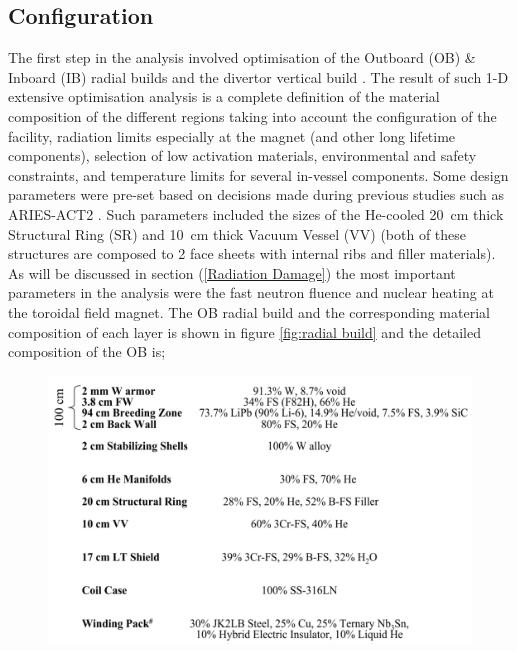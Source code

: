 \documentclass[12pt, letterpaper]{elsarticle}
\begin{document}
\subsection{Configuration} \label{Configuration}
The first step in the analysis involved optimisation of the Outboard (OB) \& Inboard (IB) radial builds and the divertor vertical build \cite{ref_2}. The result of such 1-D extensive optimisation analysis is a complete definition of the material composition of the different regions taking into account the configuration of the facility, radiation limits especially at the magnet (and other long lifetime components), selection of low activation materials, environmental and safety constraints, and temperature limits for several in-vessel components. Some design parameters were pre-set based on decisions made during previous studies such as ARIES-ACT2 \cite{ref_3}. Such parameters included the sizes of the He-cooled \SI{20}{cm} thick Structural Ring (SR) and \SI{10}{cm} thick Vacuum Vessel (VV) (both of these structures are composed to 2 face sheets with internal ribs and filler materials). As will be discussed in section (\ref{Radiation Damage}) the most important parameters in the analysis were the fast neutron fluence and nuclear heating at the toroidal field magnet. The OB radial build and the corresponding material composition of each layer is shown in figure \ref{fig:radial build} and the detailed composition of the OB is;
\begin{figure}[h!]
  \centering
  \includegraphics[scale=0.2]{../plots/OB_comp.png}
  \label{fig:OB_comp}
\end{figure}
\end{document}
